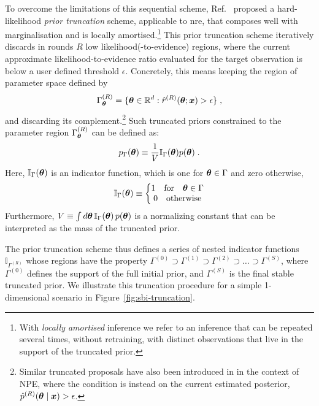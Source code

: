 To overcome the limitations of this sequential scheme, Ref.~\cite{Miller:2021aa} proposed a hard-likelihood \emph{prior truncation} scheme, applicable to \gls*{nre}, that composes well with marginalisation and is locally amortised.\footnote{With \emph{locally amortised} inference we refer to an inference that can be repeated several times, without retraining, with distinct observations that live in the support of the truncated prior.}
This prior truncation scheme iteratively discards in rounds $R$ low likelihood(-to-evidence) regions, where the current approximate likelihood-to-evidence ratio evaluated for the target observation is below a user defined threshold $\epsilon$. Concretely, this means keeping the region of parameter space defined by
\begin{equation}\label{eq:gamma_r}
    \Gamma^{(R)}_{\bm{\theta}} = \{ \bm{\theta} \in \mathbb R^d : \hat{r}^{(R)}(\bm{\theta} ; \bm{x}) > \epsilon\} \;,
\end{equation}
and discarding its complement.\footnote{Similar truncated proposals have also been introduced in \cite{Deistler:2022aa} in the context of NPE, where the condition is instead on the current estimated posterior, \eg~$\hat{p}^{(R)}(\bm{\theta} \mid\bm{x}) > \epsilon$.
}
Such truncated priors constrained to the parameter region $\Gamma^{(R)}_{\bm{\theta}}$ can be defined as:
\begin{equation}
    \label{eqn:truncated_prior}
    p_\Gamma(\bm{\theta}) \equiv  \frac1V \mathbb{I}_{\Gamma}(\bm{\theta}) p(\bm{\theta})\;.
\end{equation}
Here, $\mathbb{I}_{\Gamma}(\bm{\theta})$ is an indicator function, which is one for $\bm{\theta} \in \Gamma$ and zero otherwise,
\begin{equation}
\mathbb{I}_\Gamma(\bm{\theta}) \equiv \left\{
\begin{matrix}
1 \quad \text{for} \quad \bm{\theta} \in \Gamma\\
0 \quad \text{otherwise}
\end{matrix}
\right.
\end{equation}
Furthermore,  $V \equiv \int d\bm{\theta}\, \mathbb{I}_\Gamma(\bm{\theta})\, p(\bm{\theta})$ is a normalizing constant that can be interpreted as the mass of the truncated prior.

The prior truncation scheme thus defines a series of nested indicator functions $\mathbb{I}_{\Gamma^{(R)}}$ whose regions have the property $\Gamma^{(0)}  \supset \Gamma^{(1)}  \supset \Gamma^{(2)} \supset \dots \supset \Gamma^{(S)}$, where $\Gamma^{(0)}$ defines the support of the full initial prior, and $\Gamma^{(S)}$ is the final stable truncated prior. We illustrate this truncation procedure for a simple 1-dimensional scenario in Figure~\ref{fig:sbi-truncation}.

